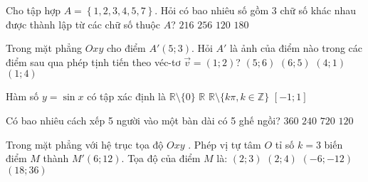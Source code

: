 \begin{ex}%
	Cho tập hợp $A=\left\{1,2,3,4,5,7\right\}$. Hỏi có bao nhiêu số gồm $3$ chữ số khác nhau được thành lập từ các chữ số thuộc $A$?
	\choice
	{$216$}
	{$256$}
	{\True $120$}
	{$180$}
\end{ex}
\begin{ex}%
	Trong mặt phẳng $Oxy$ cho điểm $A' \left(5;3\right)$. Hỏi $A'$ là ảnh của điểm nào trong các điểm sau qua phép tịnh tiến theo véc-tơ  $\vec{v}=(1;2)$?
	\choice
	{$(5;6)$}
	{$(6;5)$}
	{\True $(4;1)$}
	{$(1;4)$}
\end{ex}
\begin{ex}%
	Hàm số $y=\sin x$ có tập xác định là
	\choice
	{$\mathbb{R}\setminus \{0\}$}
	{\True $\mathbb{R}$}
	{$\mathbb{R}\setminus \{k\pi, k\in \mathbb{Z}\}$}
	{$[-1;1]$}
\end{ex}
\begin{ex}%
	Có bao nhiêu cách xếp 5 người vào một bàn dài có 5 ghế ngồi?
	\choice
	{$360$}
	{$240$}
	{$720$}
	{\True $120$}
\end{ex}
\begin{ex}%
	Trong mặt phẳng với hệ trục tọa độ $Oxy$ . Phép vị tự tâm $O$ tỉ số $k=3$  biến điểm $M$  thành $M'(6;12)$. Tọa độ của điểm $M$ là:
	\choice
	{$(2;3)$}
	{\True$(2;4)$}
	{$(-6;-12)$}
	{ $(18;36)$}
\end{ex}
